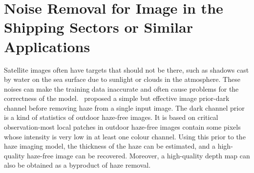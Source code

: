 \section{Noise Removal for Image in the Shipping Sectors or Similar Applications}
Satellite images often have targets that should not be there, such as shadows cast by water on the sea surface due to sunlight or clouds in the atmosphere. These noises can make the training data inaccurate and often cause problems for the correctness of the model.~ proposed a simple but effective image prior-dark channel before removing haze from a single input image. The dark channel prior is a kind of statistics of outdoor haze-free images. It is based on critical observation-most local patches in outdoor haze-free images contain some pixels whose intensity is very low in at least one colour channel. Using this prior to the haze imaging model, the thickness of the haze can be estimated, and a high-quality haze-free image can be recovered. Moreover, a high-quality depth map can also be obtained as a byproduct of haze removal.\\


